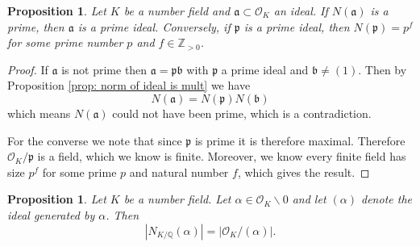 \documentclass[11pt,a4paper]{report}
\theoremstyle{plain}
\newtheorem{prop}[subsection]{Proposition}
\theoremstyle{definition}
\theoremstyle{definition}
\newcommand{\ZZ}{\mathbb{Z}}
\def\QQ{\mathbb{Q}}
\def\gothb{\mathfrak{b}}
\def\gothp{\mathfrak{p}}
\def \a{\alpha}
\def \OO {\mathcal{O}}
\def\gotha{\mathfrak{a}}
\begin{document}
	
	
	\begin{prop}
		Let $K$ be a number field and $\gotha \subset \OO_K$ an ideal. If $N(\gotha)$ is a prime, then $\gotha$ is a prime ideal. Conversely, if $\gothp$ is a prime ideal, then $N(\gothp)=p^f$ for some prime number $p$ and $f \in \ZZ_{> 0}$.
	\end{prop}
	
	\begin{proof}
		If $\gotha$ is not prime then $\gotha=\gothp\gothb$ with $\gothp$ a prime ideal and $\gothb \neq (1)$. Then by Proposition \ref{prop: norm of ideal is mult} we have \[N(\gotha)=N(\gothp)N(\gothb)\] which means $N(\gotha)$ could not have been prime, which is a contradiction.
		
		For the converse we note that since $\gothp$ is prime it is therefore maximal. Therefore $\OO_K/\gothp$ is a field, which we know is finite. Moreover, we know every finite field has size $p^f$ for some prime $p$ and natural number $f$, which gives the result.
	\end{proof}
	
	
	
	\begin{prop}\label{prop: ideal norm coincides with other norm}
		Let $K$ be a number field. Let $\a \in \OO_K \backslash 0$ and let $(\a)$ denote the ideal generated by $\a$. Then \[|N_{K/\QQ}(\a)|=|\OO_K / (\a)|.\]
	\end{prop}
	
\end{document}
